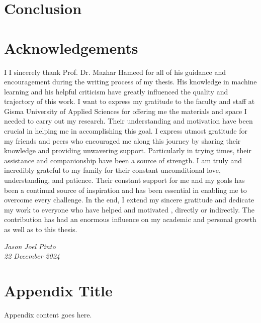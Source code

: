 \documentclass[12pt,onecolumn]{report}
\begin{document}
\chapter{Conclusion}


\chapter*{Acknowledgements}

I I sincerely thank Prof. Dr. Mazhar Hameed for all of his guidance and encouragement during the writing process of my thesis. His knowledge in machine learning and his helpful criticism have greatly influenced the quality and trajectory of this work.
I want to express my gratitude to the faculty and staff at Gisma University of Applied Sciences for offering me the materials and space I needed to carry out my research. Their understanding and motivation have been crucial in helping me in accomplishing this goal.
I express utmost gratitude for my friends and peers who encouraged me along this journey by sharing their knowledge and providing unwavering support. Particularly in trying times, their assistance and companionship have been a source of strength.
I am truly and incredibly grateful to my family for their constant uncomditional love, understanding, and patience. Their constant support for me and my goals has been a continual source of inspiration and has been essential in enabling me to overcome every challenge.
In the end, I extend my sincere gratitude and dedicate my work to everyone who have helped and motivated , directly or indirectly. The contribution has had an enormous influence on my academic and personal growth as well as to this thesis.


\begin{flushright}
\textit{Jason Joel Pinto} \\
\textit{22 December 2024}
\end{flushright}

\appendix
\chapter{Appendix Title}
Appendix content goes here.

\cleardoublepage
\printbibliography
\end{document}
